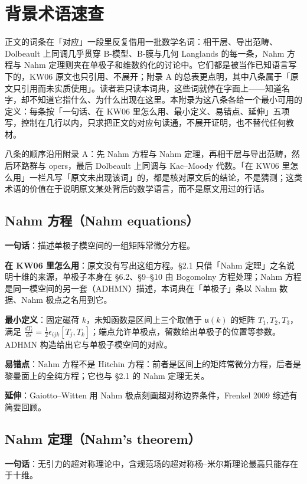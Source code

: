 \section{背景术语速查}

正文的词条在「对应」一段里反复借用一批数学名词：相干层、导出范畴、Dolbeault 上同调几乎贯穿 B-模型、B-膜与几何 Langlands 的每一条，Nahm 方程与 Nahm 定理则夹在单极子和维数约化的讨论中。它们都是被当作已知语言写下的，KW06 原文也只引用、不展开；附录 A 的总表更点明，其中八条属于「原文只引用而未实质使用」。读者若只读本词典，这些词就停在字面上——知道名字，却不知道它指什么、为什么出现在这里。本附录为这八条各给一个最小可用的定义：每条按「一句话、在 KW06 里怎么用、最小定义、易错点、延伸」五项写，控制在几行以内，只求把正文的对应句读通，不展开证明，也不替代任何教材。

八条的顺序沿用附录 A：先 Nahm 方程与 Nahm 定理，再相干层与导出范畴，然后环路群与 opers，最后 Dolbeault 上同调与 Kac--Moody 代数。「在 KW06 里怎么用」一栏凡写「原文未出现该词」的，都是核对原文后的结论，不是猜测；这类术语的价值在于说明原文某处背后的数学语言，而不是原文用过的行话。

\subsection{Nahm 方程（Nahm equations）}

\textbf{一句话}：描述单极子模空间的一组矩阵常微分方程。

\textbf{在 KW06 里怎么用}：原文没有写出这组方程。§2.1 只借「Nahm 定理」之名说明十维的来源，单极子本身在 §6.2、§9--§10 由 Bogomolny 方程处理；Nahm 方程是同一模空间的另一套（ADHMN）描述，本词典在「单极子」条以 Nahm 数据、Nahm 极点之名用到它。

\textbf{最小定义}：固定磁荷 $k$，未知函数是区间上三个取值于 $\mathfrak{u}(k)$ 的矩阵 $T_1,T_2,T_3$，满足 $\frac{dT_i}{ds}=\frac12\epsilon_{ijk}[T_j,T_k]$；端点允许单极点，留数给出单极子的位置等参数。ADHMN 构造给出它与单极子模空间的对应。

\textbf{易错点}：Nahm 方程不是 Hitchin 方程：前者是区间上的矩阵常微分方程，后者是黎曼面上的全纯方程；它也与 §2.1 的 Nahm 定理无关。

\textbf{延伸}：Gaiotto--Witten 用 Nahm 极点刻画超对称边界条件，Frenkel 2009 综述有简要回顾。

\subsection{Nahm 定理（Nahm's theorem）}

\textbf{一句话}：无引力的超对称理论中，含规范场的超对称杨--米尔斯理论最高只能存在于十维。

